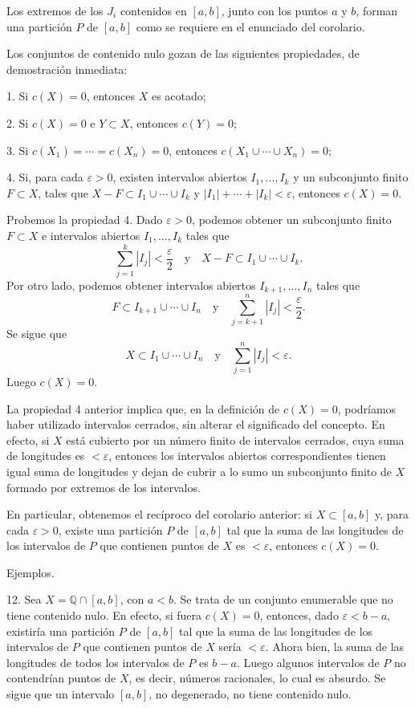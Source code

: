 \documentclass[12pt,oneside]{book}
\begin{document}
Los extremos de los \(J_i\) contenidos en \([a, b]\), junto con los puntos \(a\) y \(b\), forman una partición \(P\) de \([a, b]\) como se requiere en el enunciado del corolario.

Los conjuntos de contenido nulo gozan de las siguientes propiedades, de demostración inmediata:

1. Si \(c(X) = 0\), entonces \(X\) es acotado;

2. Si \(c(X) = 0\) e \(Y \subset X\), entonces \(c(Y) = 0\);

3. Si \(c(X_1) = \cdots = c(X_n) = 0\), entonces \(c(X_1 \cup \cdots \cup X_n) = 0\);

4. Si, para cada \(\varepsilon > 0\), existen intervalos abiertos \(I_1, \ldots, I_k\) y un subconjunto finito \(F \subset X\), tales que \(X - F \subset I_1 \cup \cdots \cup I_k\) y \(|I_1| + \cdots + |I_k| < \varepsilon\), entonces \(c(X) = 0\).

Probemos la propiedad 4. Dado \(\varepsilon > 0\), podemos obtener un subconjunto finito \(F \subset X\) e intervalos abiertos \(I_1, \ldots, I_k\) tales que
\[
\sum_{j=1}^k |I_j| < \frac{\varepsilon}{2}
\quad \text{y} \quad
X - F \subset I_1 \cup \cdots \cup I_k.
\]
Por otro lado, podemos obtener intervalos abiertos \(I_{k+1}, \ldots, I_n\) tales que
\[
F \subset I_{k+1} \cup \cdots \cup I_n
\quad \text{y} \quad
\sum_{j=k+1}^n |I_j| < \frac{\varepsilon}{2}.
\]
Se sigue que
\[
X \subset I_1 \cup \cdots \cup I_n
\quad \text{y} \quad
\sum_{j=1}^n |I_j| < \varepsilon.
\]
Luego \(c(X) = 0\).

La propiedad 4 anterior implica que, en la definición de \(c(X) = 0\), podríamos haber utilizado intervalos cerrados, sin alterar el significado del concepto. En efecto, si \(X\) está cubierto por un número finito de intervalos cerrados, cuya suma de longitudes es \(< \varepsilon\), entonces los intervalos abiertos correspondientes tienen igual suma de longitudes y dejan de cubrir a lo sumo un subconjunto finito de \(X\) formado por extremos de los intervalos.

En particular, obtenemos el recíproco del corolario anterior: si \(X \subset [a, b]\) y, para cada \(\varepsilon > 0\), existe una partición \(P\) de \([a, b]\) tal que la suma de las longitudes de los intervalos de \(P\) que contienen puntos de \(X\) es \(< \varepsilon\), entonces \(c(X) = 0\).

Ejemplos.

12. Sea \( X = \mathbb{Q} \cap [a, b] \), con \( a < b \). Se trata de un conjunto enumerable que no tiene contenido nulo. En efecto, si fuera \( c(X) = 0 \), entonces, dado \( \varepsilon < b - a \), existiría una partición \( P \) de \( [a, b] \) tal que la suma de las longitudes de los intervalos de \( P \) que contienen puntos de \( X \) sería \( < \varepsilon \). Ahora bien, la suma de las longitudes de todos los intervalos de \( P \) es \( b - a \). Luego algunos intervalos de \( P \) no contendrían puntos de \( X \), es decir, números racionales, lo cual es absurdo. Se sigue que un intervalo \( [a, b] \), no degenerado, no tiene contenido nulo.
\end{document}
